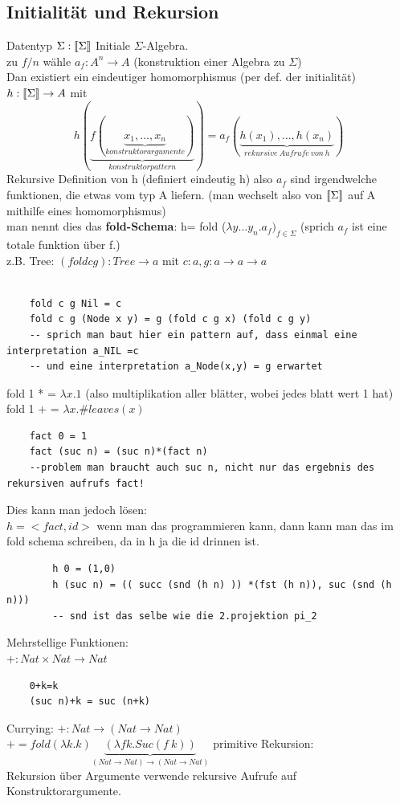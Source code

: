 \documentclass{article}
\theoremstyle{definition}
\begin{document}
	\subsection{Initialität und Rekursion}
	Datentyp $\Sigma:\llbracket \Sigma\rrbracket$ Initiale $\Sigma$-Algebra.\\
	zu $f/n$ wähle $a_f: A^n\to A$ (konstruktion einer Algebra zu $\Sigma$)\\
	Dan existiert ein eindeutiger homomorphismus (per def. der initialität) $h:\llbracket \Sigma\rrbracket\to A$ mit
	\[h(\underbrace{f(\underbrace{x_1,\dots,x_n}_{konstruktorargumente})}_{konstruktorpattern}) = a_f(\underbrace{h(x_1),\dots, h(x_n)}_{rekursive\ Aufrufe\ von\ h})\]
	Rekursive Definition von h (definiert eindeutig h) also $a_f$ sind irgendwelche funktionen, die etwas vom typ A liefern. (man wechselt also von $\llbracket \Sigma\rrbracket$ auf A mithilfe eines homomorphismus)\\
	man nennt dies das \textbf{fold-Schema}: h= fold ($\lambda y\dots y_n. a_f)_{f\in\Sigma}$ (sprich $a_f$ ist eine totale funktion über f.)\\
	z.B. Tree: $(fold c g):Tree\to a$ mit $c:a, g:a\to a\to a$\\
	\begin{verbatim}

	fold c g Nil = c
	fold c g (Node x y) = g (fold c g x) (fold c g y)
	-- sprich man baut hier ein pattern auf, dass einmal eine interpretation a_NIL =c
	-- und eine interpretation a_Node(x,y) = g erwartet
	\end{verbatim}
	fold 1 * = $\lambda x.1$ (also multiplikation aller blätter, wobei jedes blatt wert 1 hat)\\
	fold 1 + = $\lambda x.\#leaves(x)$\\
	\begin{verbatim}
	fact 0 = 1
	fact (suc n) = (suc n)*(fact n)
	--problem man braucht auch suc n, nicht nur das ergebnis des rekursiven aufrufs fact!
	\end{verbatim}
	Dies kann man jedoch lösen:\\
	$h=<fact,id>$ wenn man das programmieren kann, dann kann man das im fold schema schreiben, da in h ja die id drinnen ist.
	\begin{verbatim}
		h 0 = (1,0)
		h (suc n) = (( succ (snd (h n) )) *(fst (h n)), suc (snd (h n)))
		-- snd ist das selbe wie die 2.projektion pi_2
	\end{verbatim}
	Mehrstellige Funktionen:\\
	$+: Nat\times Nat\to Nat$\\
	\begin{verbatim}
	0+k=k
	(suc n)+k = suc (n+k)
	\end{verbatim}
	Currying: $+:Nat\to (Nat\to Nat)$\\
	$+ = fold (\lambda k.k) \underbrace{(\lambda fk.Suc (f\ k))}_{(Nat\to Nat)\to (Nat\to Nat)}$
	primitive Rekursion:\\
	Rekursion über Argumente verwende rekursive Aufrufe auf Konstruktorargumente.\\
\end{document}
